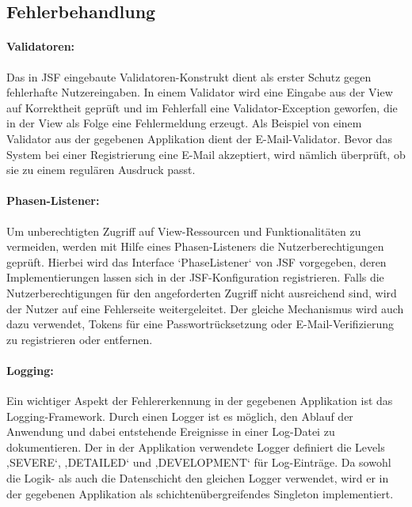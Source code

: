 \documentclass{article}
\begin{document}
\subsection{Fehlerbehandlung}

\paragraph{Validatoren:}
Das in JSF eingebaute Validatoren-Konstrukt dient als erster Schutz gegen fehlerhafte Nutzereingaben. 
In einem Validator wird eine Eingabe aus der View auf Korrektheit geprüft und im Fehlerfall eine Validator-Exception geworfen, die in der View als Folge eine Fehlermeldung erzeugt. 
Als Beispiel von einem Validator aus der gegebenen Applikation dient der E-Mail-Validator. Bevor das System bei einer Registrierung eine E-Mail akzeptiert, wird nämlich überprüft, ob sie zu einem regulären Ausdruck passt. 

\paragraph{Phasen-Listener:} 
Um unberechtigten Zugriff auf View-Ressourcen und Funktionalitäten zu vermeiden, werden mit Hilfe eines Phasen-Listeners die Nutzerberechtigungen geprüft. 
Hierbei wird das Interface ‘PhaseListener‘ von JSF vorgegeben, deren Implementierungen lassen sich in der JSF-Konfiguration registrieren. 
Falls die Nutzerberechtigungen für den angeforderten Zugriff nicht ausreichend sind, wird der Nutzer auf eine Fehlerseite weitergeleitet. 
Der gleiche Mechanismus wird auch dazu verwendet, Tokens für eine Passwortrücksetzung oder E-Mail-Verifizierung zu registrieren oder entfernen. 

\paragraph{Logging:} 
Ein wichtiger Aspekt der Fehlererkennung in der gegebenen Applikation ist das Logging-Framework. Durch einen Logger ist es möglich, den Ablauf der Anwendung und dabei entstehende Ereignisse in einer Log-Datei zu dokumentieren. 
Der in der Applikation verwendete Logger definiert die Levels ‚SEVERE‘, ‚DETAILED‘ und ‚DEVELOPMENT‘ für Log-Einträge. 
Da sowohl die Logik- als auch die Datenschicht den gleichen Logger verwendet, wird er in der gegebenen Applikation als schichtenübergreifendes Singleton implementiert.
\end{document}
